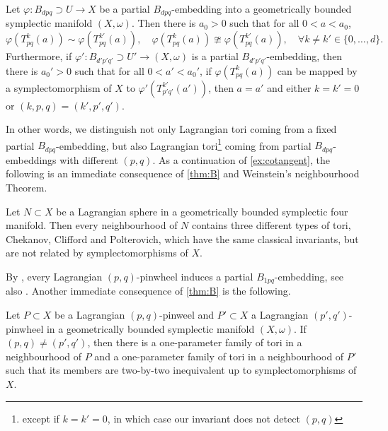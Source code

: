 \documentclass[12pt,a4paper,abstract=true,draft]{scrartcl}
\begin{document}
\begin{maintheorem}
    \label{thm:B}
    Let $\varphi \colon B_{dpq} \supset U \rightarrow X$ be a partial $B_{dpq}$-embedding into a geometrically bounded symplectic manifold $(X,\omega)$.
Then there is $a_0 > 0$ such that for all $0 < a < a_0$, 
    \begin{equation}
        \varphi(T^k_{pq}(a)) \sim \varphi(T^{k'}_{pq}(a)), \quad 
        \varphi(T^k_{pq}(a)) \ncong \varphi(T^{k'}_{pq}(a)), \quad
        \forall k \neq k' \in \{0,\ldots,d\}.
    \end{equation}
    Furthermore, if $\varphi' \colon B_{d'p'q'} \supset U' \rightarrow (X,\omega)$ is a partial $B_{d'p'q'}$-embedding, then there is $a_0' > 0$ such that for all $0<a' < a_0'$, if $\varphi(T^k_{pq}(a))$ can be mapped by a symplectomorphism of $X$ to $\varphi'(T^{k'}_{p'q'}(a'))$, then $a=a'$ and either $k = k' = 0$ or $(k,p,q) = (k',p',q')$. 
\end{maintheorem}

In other words, we distinguish not only Lagrangian tori coming from a fixed partial $B_{dpq}$-embedding, but also Lagrangian tori\footnote{except if $k=k'=0$, in which case our invariant does not detect $(p,q)$} coming from partial $B_{dpq}$-embeddings with different $(p,q)$.
As a continuation of \cref{ex:cotangent}, the following is an immediate consequence of \cref{thm:B} and Weinstein's neighbourhood Theorem.

\begin{corollary}
    \label{thm:lag_sphere}
    Let $N \subset X$ be a Lagrangian sphere in a geometrically bounded symplectic four manifold.
    Then every neighbourhood of $N$ contains three different types of tori, Chekanov, Clifford and Polterovich, which have the same classical invariants, but are not related by symplectomorphisms of $X$.
\end{corollary}

By \cite{Kho13}, every Lagrangian $(p,q)$-pinwheel induces a partial $B_{1pq}$-embedding, see also \cite[Definition 2.10]{EvaSmi18}.
Another immediate consequence of \cref{thm:B} is the following.

\begin{corollary}
    Let $P \subset X$ be a Lagrangian $(p,q)$-pinweel and $P' \subset X$ a Lagrangian $(p',q')$-pinwheel in a geometrically bounded symplectic manifold $(X,\omega)$.
    If $(p,q) ≠ (p',q')$, then there is a one-parameter family of tori in a neighbourhood of $P$ and a one-parameter family of tori in a neighbourhood of $P'$ such that its members are two-by-two inequivalent up to symplectomorphisms of $X$.
\end{corollary}
\end{document}
